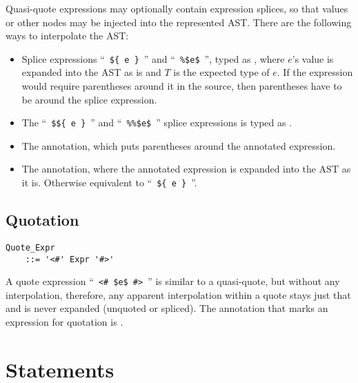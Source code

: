 Quasi-quote expressions may optionally contain expression splices, so that values or other nodes may be injected into the represented AST. There are the following ways to interpolate the AST:
\begin{itemize}
  \item Splice expressions ``~\lstinline[mathescape=false]!${ e }!~'' and ``~\lstinline!%$e$!~'', typed as , where $e$'s value is expanded into the AST as is and $T$ is the expected type of $e$. If the expression would require parentheses around it in the source, then parentheses have to be around the splice expression.
  \item The ``~\lstinline[mathescape=false]!$${ e }!~'' and ``~\lstinline!%%$e$!~'' splice expressions is typed as . 
  \item The  annotation, which puts parentheses around the annotated expression.
  \item The  annotation, where the annotated expression is expanded into the AST as it is. Otherwise equivalent to ``~\lstinline[mathescape=false]!${ e }!~''.
\end{itemize}







\subsection{Quotation}
\label{sec:quotation}

\grammar\begin{lstlisting}
Quote_Expr
    ::= '<#' Expr '#>'
\end{lstlisting}

A quote expression ``~\lstinline!<# $e$ #>!~'' is similar to a quasi-quote, but without any interpolation, therefore, any apparent interpolation within a quote stays just that and is never expanded (unquoted or spliced). The annotation that marks an expression for quotation is . 





\section{Statements}
\label{sec:statements}

